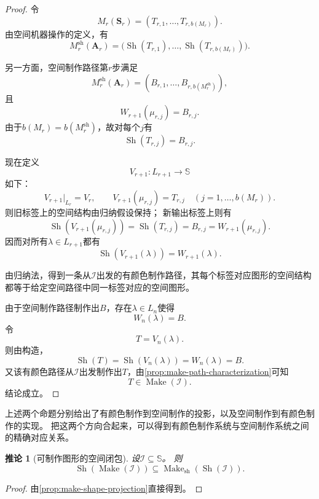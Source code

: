 \documentclass[UTF8,fontset=none]{ctexart}
\theoremstyle{cnthm}
\newtheorem{corollary}{推论}[section]
\begin{document}
\begin{proof}
				令
				$$
				M_r(\mathbf{S}_r)
				=
				(T_{r,1},\dots,T_{r,b(M_r)}).
				$$
				由空间机器操作的定义，有
				$$
				M_r^{\mathrm{sh}}(\mathbf{A}_r)
				=
				\bigl(
				\operatorname{Sh}(T_{r,1}),\dots,
				\operatorname{Sh}(T_{r,b(M_r)})
				\bigr).
				$$
				
				另一方面，空间制作路径第$r$步满足
				$$
				M_r^{\mathrm{sh}}(\mathbf{A}_r)
				=
				(B_{r,1},\dots,B_{r,b(M_r^{\mathrm{sh}})}),
				$$
				且
				$$
				W_{r+1}(\mu_{r,j})=B_{r,j}.
				$$
				由于$b(M_r)=b(M_r^{\mathrm{sh}})$，故对每个$j$有
				$$
				\operatorname{Sh}(T_{r,j})=B_{r,j}.
				$$
				
				现在定义
				$$
				V_{r+1}:L_{r+1}\to\mathbb{S}
				$$
				如下：
				$$
				V_{r+1}|_{L_r}=V_r,
				\qquad
				V_{r+1}(\mu_{r,j})=T_{r,j}
				\quad(j=1,\dots,b(M_r)).
				$$
				则旧标签上的空间结构由归纳假设保持；
				新输出标签上则有
				$$
				\operatorname{Sh}(V_{r+1}(\mu_{r,j}))
				=
				\operatorname{Sh}(T_{r,j})
				=
				B_{r,j}
				=
				W_{r+1}(\mu_{r,j}).
				$$
				因而对所有$\lambda\in L_{r+1}$都有
				$$
				\operatorname{Sh}(V_{r+1}(\lambda))=W_{r+1}(\lambda).
				$$
				
				由归纳法，得到一条从$\mathcal{I}$出发的有颜色制作路径，其每个标签对应图形的空间结构都等于给定空间路径中同一标签对应的空间图形。
				
				由于空间制作路径制作出$B$，存在$\lambda\in L_n$使得
				$$
				W_n(\lambda)=B.
				$$
				令
				$$
				T=V_n(\lambda).
				$$
				则由构造，
				$$
				\operatorname{Sh}(T)
				=
				\operatorname{Sh}(V_n(\lambda))
				=
				W_n(\lambda)
				=
				B.
				$$
				又该有颜色路径从$\mathcal{I}$出发制作出$T$，由\cref{prop:make-path-characterization}可知
				$$
				T\in\operatorname{Make}(\mathcal{I}).
				$$
				结论成立。
			\end{proof}
			
			上述两个命题分别给出了有颜色制作到空间制作的投影，以及空间制作到有颜色制作的实现。
			把这两个方向合起来，可以得到有颜色制作系统与空间制作系统之间的精确对应关系。
			
			\begin{corollary}[可制作图形的空间闭包]\label{cor:make-shape-closure}
				设$\mathcal{I}\subseteq\mathbb{S}$。
				则
				$$
				\operatorname{Sh}(\operatorname{Make}(\mathcal{I}))
				\subseteq
				\operatorname{Make}_{\mathrm{sh}}(\operatorname{Sh}(\mathcal{I})).
				$$
			\end{corollary}
			
			\begin{proof}
				由\cref{prop:make-shape-projection}直接得到。
			\end{proof}
			
\end{document}
